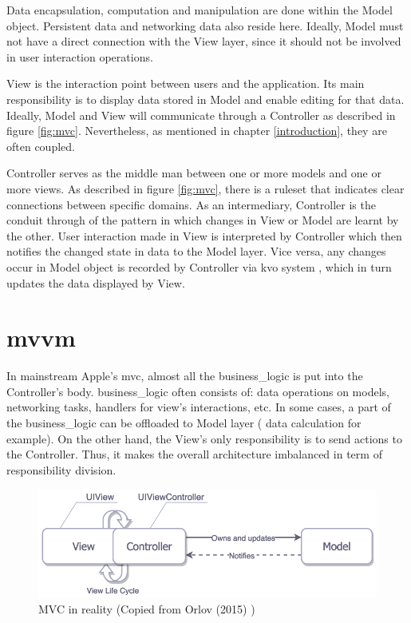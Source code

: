 \documentclass[11pt,a4paper,oneside,article]{memoir}
\begin{document}
Data encapsulation, computation and manipulation are done within the Model object. Persistent data and networking data also reside here. Ideally, Model must not have a direct connection with the View layer, since it should not be involved in user interaction operations.

View is the interaction point between users and the application. Its main responsibility is to display data stored in Model and enable editing for that data. Ideally, Model and View will communicate through a Controller as described in figure \ref{fig:mvc}. Nevertheless, as mentioned in chapter \ref{introduction}, they are often coupled.

Controller serves as the middle man between one or more models and one or more views. As described in figure \ref{fig:mvc}, there is a ruleset that indicates clear connections between specific domains. As an intermediary, Controller is the conduit through of the pattern in which changes in View or Model are learnt by the other. 
User interaction made in View is interpreted by Controller which then notifies the changed state in data to the Model layer. Vice versa, any changes occur in Model object is recorded by Controller via \gls{kvo} system \cite{apple:kvo}, which in turn updates the data displayed by View. \cite{apple:mvc}

\section{\acrfull{mvvm}}\label{section:mvvm}
In mainstream Apple's \gls{mvc}, almost all the \gls{business_logic} is put into the Controller's body. \Gls{business_logic} often consists of: data operations on models, networking tasks, handlers for view's interactions, etc. In some cases, a part of the \gls{business_logic} can be offloaded to Model layer ( data calculation for example). On the other hand, the View's only responsibility is to send actions to the Controller. Thus, it makes the overall architecture imbalanced in term of responsibility division.

\begin{figure}[h]

\centering
\includegraphics[width=\textwidth]{mvcInReality}

\caption{MVC in reality (Copied from Orlov (2015) \cite{medium:pattern})}
\label{fig:mvcInReality}

\end{figure}
\end{document}
